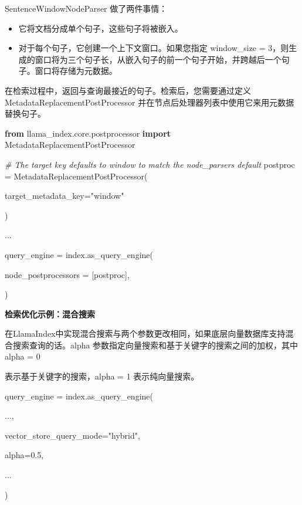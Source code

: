 \documentclass[
]{article}
\newenvironment{Shaded}{}{}
\newcommand{\CommentTok}[1]{\textcolor[rgb]{0.38,0.63,0.69}{\textit{#1}}}
\newcommand{\FloatTok}[1]{\textcolor[rgb]{0.25,0.63,0.44}{#1}}
\newcommand{\ImportTok}[1]{\textcolor[rgb]{0.00,0.50,0.00}{\textbf{#1}}}
\newcommand{\NormalTok}[1]{#1}
\newcommand{\OperatorTok}[1]{\textcolor[rgb]{0.40,0.40,0.40}{#1}}
\newcommand{\StringTok}[1]{\textcolor[rgb]{0.25,0.44,0.63}{#1}}
\begin{document}
SentenceWindowNodeParser 做了两件事情：

\begin{itemize}
\item
  它将文档分成单个句子，这些句子将被嵌入。
\item
  对于每个句子，它创建一个上下文窗口。如果您指定 window\_size =
  3，则生成的窗口将为三个句子长，从嵌入句子的前一个句子开始，并跨越后一个句子。窗口将存储为元数据。
\end{itemize}

在检索过程中，返回与查询最接近的句子。检索后，您需要通过定义
MetadataReplacementPostProcessor
并在节点后处理器列表中使用它来用元数据替换句子。

\begin{Shaded}
\begin{Highlighting}[]
\ImportTok{from}\NormalTok{ llama\_index.core.postprocessor }\ImportTok{import}\NormalTok{ MetadataReplacementPostProcessor
}


\CommentTok{\# The target key defaults to \textasciigrave{}window\textasciigrave{} to match the node\_parser\textquotesingle{}s default
}
\NormalTok{postproc }\OperatorTok{=}\NormalTok{ MetadataReplacementPostProcessor(
}
\NormalTok{    target\_metadata\_key}\OperatorTok{=}\StringTok{"window"}

\NormalTok{)
}
\NormalTok{...
}
\NormalTok{query\_engine }\OperatorTok{=}\NormalTok{ index.as\_query\_engine( 
}
\NormalTok{    node\_postprocessors }\OperatorTok{=}\NormalTok{ [postproc],
}
\NormalTok{)}
\end{Highlighting}
\end{Shaded}

\textbf{检索优化示例：混合搜索}

在LlamaIndex中实现混合搜索与两个参数更改相同，如果底层向量数据库支持混合搜索查询的话。alpha
参数指定向量搜索和基于关键字的搜索之间的加权，其中 alpha = 0

表示基于关键字的搜索，alpha = 1 表示纯向量搜索。

\begin{Shaded}
\begin{Highlighting}[]
\NormalTok{query\_engine }\OperatorTok{=}\NormalTok{ index.as\_query\_engine(
}
\NormalTok{    ...,
}
\NormalTok{    vector\_store\_query\_mode}\OperatorTok{=}\StringTok{"hybrid"}\NormalTok{, 
}
\NormalTok{    alpha}\OperatorTok{=}\FloatTok{0.5}\NormalTok{,
}
\NormalTok{    ...
}
\NormalTok{)}
\end{Highlighting}
\end{Shaded}
\end{document}
